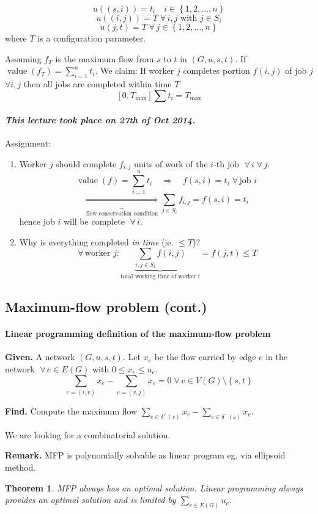 \documentclass{article}
\newtheorem{theorem}{Theorem}
\newcommand{\set}[1]{\left\{#1\right\}}
\newcommand{\given}[1]{\textbf{Given.} #1\par}
\newcommand{\find}[1]{\textbf{Find.} #1\par}
\newcommand{\dateref}[1]{\paragraph{\textit{This lecture took place on #1.}}}
\newcommand{\fall}{\;\forall\,}
\begin{document}
\[
  u((s, i)) = t_i  \quad i \in \set{1, 2, \ldots, n}
\] \[
  u((i, j)) = T \fall i, j \text{ with } j \in S_i
\] \[
  u(j, t) = T \fall j \in \set{1, 2, \ldots, n}
\]
where $T$ is a configuration parameter.

Assuming $f_T$ is the maximum flow from $s$ to $t$ in $(G, u, s, t)$. If $\operatorname{value}(f_T) = \sum_{i=1}^n t_i$. We claim: If worker $j$ completes portion $f(i, j)$ of job $j$ $\forall i, j$ then all jobs are completed within time $T$
\[
  [0, T_\text{max}] \sum t_i = T_\text{max}
\]

\dateref{27th of Oct 2014}

Assignment:
\begin{enumerate}
  \item Worker $j$ should complete $f_{i,j}$ units of work of the $i$-th job $\fall i \fall j$.
    \[
      \operatorname{value}{(f)} = \sum_{i=1}^n t_i \quad\Rightarrow\quad f(s, i) = t_i
        \fall \text{job } i
    \] \[
      \underbrace{\Rightarrow}_{\text{flow conservation condition}}
        \sum_{j \in S_i} f_{i,j} = f(s, i) = t_i
    \]
    hence job $i$ will be complete $\fall i$.
  \item Why is everything completed \emph{in time} (ie. $\leq T$)?
    \[
      \fall \text{worker } j:
        \underbrace{\sum_{i,j \in S_i} f(i, j)}_{\text{total working time of worker i}}
        = f(j, t) \leq T
    \]
\end{enumerate}

\subsection{Maximum-flow problem (cont.)}

\paragraph{Linear programming definition of the maximum-flow problem}
%
\given{A network $(G, u, s, t)$. Let $x_e$ be the flow carried by edge $e$ in the network $\fall e \in E(G)$ with $0 \leq x_e \leq u_e$.
\[
  \sum_{e=(i,v)} x_e - \sum_{e=(v,j)} x_e = 0 \fall v \in V(G) \setminus \set{s, t}
\]}
\find{Compute the maximum flow $\sum_{e \in \delta^+(s)} x_e - \sum_{e \in \delta^-(s)} x_e$.}

We are looking for a combinatorial solution.

\textbf{Remark.} MFP is polynomially solvable as linear program eg. via ellipsoid method.

\begin{theorem}
  \label{proposition-4.1}
  MFP always has an optimal solution. Linear programming always provides an optimal solution and is limited by $\sum_{e \in E(G)} u_e$.
\end{theorem}
\end{document}
